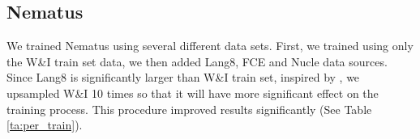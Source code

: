 \documentclass[11pt,a4paper]{article}
\begin{document}
\subsection{Nematus} \label{sec:nematus}
We trained Nematus using several different data sets. First, we trained using only the W\&I train set data,  we then added Lang8, FCE and Nucle data sources. Since Lang8 is significantly larger than W\&I train set, inspired by \citet{JunczysDowmunt2018ApproachingNG}, we upsampled W\&I 10 times  so that it will have more significant effect on the training process. This procedure improved results significantly (See Table \ref{ta:per_train}).

\begin{table}[htb]
\caption{Nematus performance on W\&I dev set by training data. The use of more data improves the system, but only when the training from the domain is upsampled. \label{ta:per_train}}
\end{table}
\end{document}
